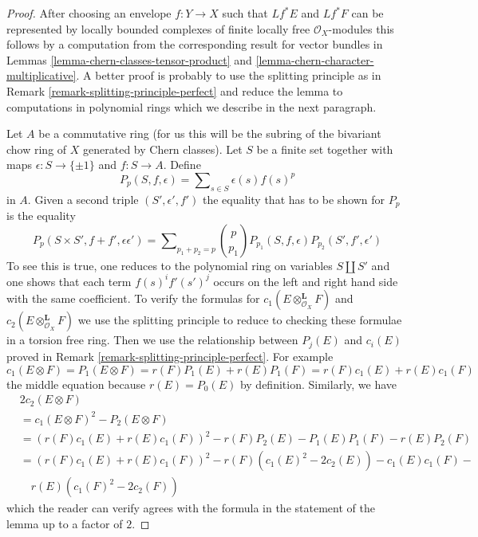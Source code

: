 \documentclass[10pt,a4paper]{amsart}
\theoremstyle{plain}
\theoremstyle{definition}
\theoremstyle{remark}
\numberwithin{equation}{subsection}
\begin{document}
\begin{proof}
After choosing an envelope $f : Y \to X$ such that $Lf^*E$ and $Lf^*F$
can be represented by locally bounded complexes of finite locally
free $\mathcal{O}_X$-modules this follows by a computation from the
corresponding result for vector bundles in
Lemmas \ref{lemma-chern-classes-tensor-product} and
\ref{lemma-chern-character-multiplicative}.
A better proof is probably to use the splitting principle as in
Remark \ref{remark-splitting-principle-perfect}
and reduce the lemma to computations in polynomial rings 
which we describe in the next paragraph.

\medskip\noindent
Let $A$ be a commutative ring (for us this will be the subring of the
bivariant chow ring of $X$ generated by Chern classes).
Let $S$ be a finite set together with maps $\epsilon : S \to \{\pm 1\}$
and $f : S \to A$. Define
$$
P_p(S, f , \epsilon) = \sum\nolimits_{s \in S} \epsilon(s) f(s)^p
$$
in $A$. Given a second triple $(S', \epsilon', f')$
the equality that has to be shown for $P_p$ is the equality
$$
P_p(S \times S', f + f' , \epsilon \epsilon') = 
\sum\nolimits_{p_1 + p_2 = p}
{p \choose p_1} P_{p_1}(S, f, \epsilon) P_{p_2}(S', f', \epsilon')
$$
To see this is true, one reduces to the polynomial ring on variables
$S \amalg S'$ and one shows that each term $f(s)^if'(s')^j$ occurs
on the left and right hand side with the same coefficient.
To verify the formulas for $c_1(E \otimes_{\mathcal{O}_X}^\mathbf{L} F)$
and $c_2(E \otimes_{\mathcal{O}_X}^\mathbf{L} F)$ we use the splitting
principle to reduce to checking these formulae in a torsion free ring.
Then we use the relationship between $P_j(E)$ and $c_i(E)$ proved
in Remark \ref{remark-splitting-principle-perfect}. For example
$$
c_1(E \otimes F) = P_1(E \otimes F) = r(F)P_1(E) + r(E)P_1(F) =
r(F)c_1(E) + r(E)c_1(F)
$$
the middle equation because $r(E) = P_0(E)$ by definition. Similarly, we have
\begin{align*}
& 2c_2(E \otimes F) \\
& = c_1(E \otimes F)^2 - P_2(E \otimes F) \\
& =
(r(F)c_1(E) + r(E)c_1(F))^2 -
r(F)P_2(E) - P_1(E)P_1(F) - r(E)P_2(F) \\
& =
(r(F)c_1(E) + r(E)c_1(F))^2 -
r(F)(c_1(E)^2 - 2c_2(E)) - c_1(E)c_1(F) - \\
& \quad r(E)(c_1(F)^2 - 2c_2(F))
\end{align*}
which the reader can verify agrees with the formula in the statement
of the lemma up to a factor of $2$.
\end{proof}
\end{document}
